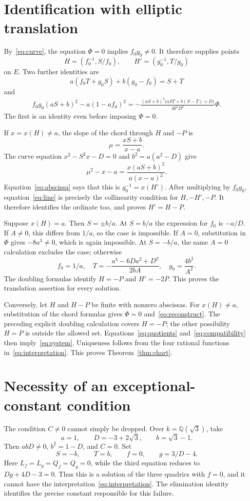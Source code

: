 \documentclass[11pt,a4paper]{article}
\newcommand{\Q}{\mathbb Q}
\begin{document}
\section{Identification with elliptic translation}
By~\eqref{eq:curve}, the equation $\Phi=0$ implies $f_0g_0\ne0$.
It therefore supplies points
\[
 H=(f_0^{-1},S/f_0),\qquad H'=(g_0^{-1},T/g_0)
\]
on $E$. Two further identities are
\begin{equation}\label{eq:line}
 a(f_0T+g_0S)+b(g_0-f_0)=S+T
\end{equation}
and
\begin{equation}\label{eq:abscissa}
\begin{split}
 f_0g_0(aS+b)^2-a(1-af_0)^2
 =-\frac{(aS+b)^2\bigl(aST+b(S-T)+D\bigr)}{4b^2D^2}\Phi.
\end{split}
\end{equation}
The first is an identity even before imposing $\Phi=0$.

If $x=x(H)\ne a$, the slope of the chord through $H$ and $-P$ is
\[
 \mu=\frac{xS+b}{x-a}.
\]
The curve equation $x^2-S^2x-D=0$ and $b^2=a(a^2-D)$ give
\[
 \mu^2-x-a=\frac{x(aS+b)^2}{a(x-a)^2}.
\]
Equation~\eqref{eq:abscissa} says that this is $g_0^{-1}=x(H')$.
After multiplying by $f_0g_0$, equation~\eqref{eq:line} is precisely
the collinearity condition for $H,-H',-P$. It therefore identifies the
ordinate too, and proves $H'=H-P$.

Suppose $x(H)=a$. Then $S=\pm b/a$. At $S=b/a$ the expression
for $f_0$ is $-a/D$. If $A\ne0$, this differs from $1/a$, so the
case is impossible. If $A=0$, substitution in $\Phi$ gives
$-8a^3\ne0$, which is again impossible. At $S=-b/a$, the same
$A=0$ calculation excludes the case; otherwise
\[
 f_0=1/a,\quad
 T=-\frac{a^4-6Da^2+D^2}{2bA},\quad
 g_0=\frac{4b^2}{A^2}.
\]
The doubling formulas identify $H=-P$ and $H'=-2P$.
This proves the translation assertion for every solution.

Conversely, let $H$ and $H-P$ be finite with nonzero abscissas.
For $x(H)\ne a$, substitution of the chord formulas gives $\Phi=0$
and~\eqref{eq:reconstruct}. The preceding explicit doubling calculation
covers $H=-P$; the other possibility $H=P$ is outside the allowed
set. Equations~\eqref{eq:quotients} and~\eqref{eq:compatibility}
then imply~\eqref{eq:system}. Uniqueness follows from the four
rational functions in~\eqref{eq:interpretation}. This proves
Theorem~\ref{thm:chart}.

\section{Necessity of an exceptional-constant condition}
The condition $C\ne0$ cannot simply be dropped. Over
$k=\Q(\sqrt3)$, take
\[
 a=1,\qquad D=-3+2\sqrt3,\qquad b=\sqrt3-1.
\]
Then $abD\ne0$, $b^2=1-D$, and $C=0$. Set
\[
 S=-b,\qquad T=b,\qquad f=0,\qquad g=3/D-4.
\]
Here $L_f=L_g=Q_f=Q_g=0$, while the third equation reduces to
$Dg+4D-3=0$. Thus this is a solution of the three quadrics with
$f=0$, and it cannot have the interpretation~\eqref{eq:interpretation}.
The elimination identity identifies the precise constant responsible
for this failure.
\end{document}
